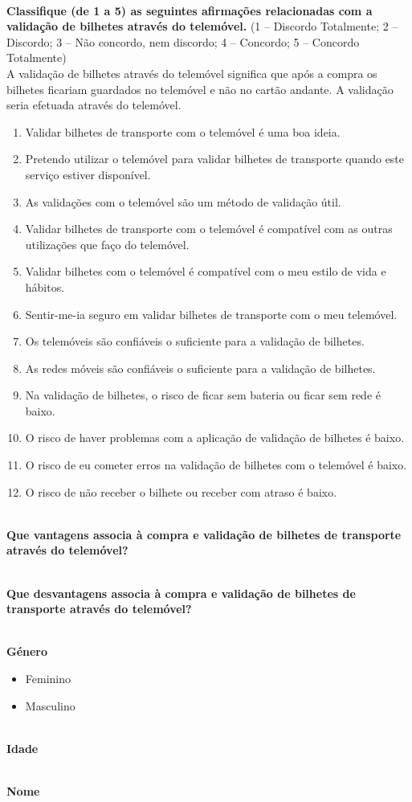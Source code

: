 ~\\\textbf{Classifique (de 1 a 5) as seguintes afirmações relacionadas com a validação de bilhetes através do telemóvel.} (1 – Discordo Totalmente; 2 – Discordo; 3 – Não concordo, nem discordo; 4 – Concordo; 5 – Concordo Totalmente) 
\\A validação de bilhetes através do telemóvel significa que após a compra os bilhetes ficariam guardados no telemóvel e não no cartão andante. A validação seria efetuada através do telemóvel.
\begin{enumerate}
\item Validar bilhetes de transporte com o telemóvel é uma boa ideia.	
\item Pretendo utilizar o telemóvel para validar bilhetes de transporte quando este serviço estiver disponível.	
\item As validações com o telemóvel são um método de validação útil.	
\item Validar bilhetes de transporte com o telemóvel é compatível com as outras utilizações que faço do telemóvel.	
\item Validar bilhetes com o telemóvel é compatível com o meu estilo de vida e hábitos.	
\item Sentir-me-ia seguro em validar bilhetes de transporte com o meu telemóvel.	
\item Os telemóveis são confiáveis o suficiente para a validação de bilhetes.	
\item As redes móveis são confiáveis o suficiente para a validação de bilhetes.	
\item Na validação de bilhetes, o risco de ficar sem bateria ou ficar sem rede é baixo.	
\item O risco de haver problemas com a aplicação de validação de bilhetes é baixo.	
\item O risco de eu cometer erros na validação de bilhetes com o telemóvel é baixo.	
\item O risco de não receber o bilhete ou receber com atraso é baixo.
\end{enumerate}

~\\\textbf{Que vantagens associa à compra e validação de bilhetes de transporte através do telemóvel?}
 
~\\\textbf{Que desvantagens associa à compra e validação de bilhetes de transporte através do telemóvel?}
 
~\\\textbf{Género}
\begin{itemize}
\item Feminino
\item Masculino
\end{itemize}

~\\\textbf{Idade}
 
~\\\textbf{Nome}